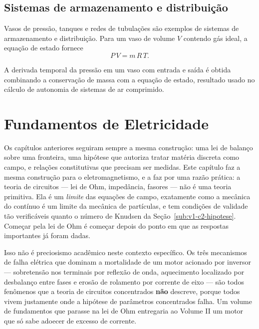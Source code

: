 \documentclass[12pt,a4paper]{article}
\numberwithin{equation}{section}
\numberwithin{table}{section}
\numberwithin{figure}{section}
\begin{document}
\subsection{Sistemas de armazenamento e distribuição}

Vasos de pressão, tanques e redes de tubulações são exemplos de sistemas de
armazenamento e distribuição. Para um vaso de volume $V$ contendo gás ideal,
a equação de estado fornece
\begin{equation}\label{eq:v1-c6-6}
P\,V = m\,R\,T.
\end{equation}

A derivada temporal da pressão em um vaso com entrada e saída é obtida
combinando a conservação de massa com a equação de estado, resultado usado no
cálculo de autonomia de sistemas de ar comprimido.


\section{Fundamentos de Eletricidade}\label{sec:eletrica}

Os capítulos anteriores seguiram sempre a mesma construção: uma lei de balanço
sobre uma fronteira, uma hipótese que autoriza tratar matéria discreta como
campo, e relações constitutivas que precisam ser medidas. Este capítulo faz a
mesma construção para o eletromagnetismo, e a faz por uma razão prática: a
teoria de circuitos --- lei de Ohm, impedância, fasores --- não é uma teoria
primitiva. Ela é um \emph{limite} das equações de campo, exatamente como a
mecânica do contínuo é um limite da mecânica de partículas, e tem condições de
validade tão verificáveis quanto o número de Knudsen da
Seção~\ref{sub:v1-c2-hipotese}. Começar pela lei de Ohm é começar depois do
ponto em que as respostas importantes já foram dadas.

Isso não é preciosismo acadêmico neste contexto específico. Os três mecanismos
de falha elétrica que dominam a mortalidade de um motor acionado por inversor
--- sobretensão nos terminais por reflexão de onda, aquecimento localizado por
desbalanço entre fases e erosão de rolamento por corrente de eixo --- são todos
fenômenos que a teoria de circuitos concentrados \textbf{não} descreve, porque
todos vivem justamente onde a hipótese de parâmetros concentrados falha. Um
volume de fundamentos que parasse na lei de Ohm entregaria ao Volume II um
motor que só sabe adoecer de excesso de corrente.
\end{document}
